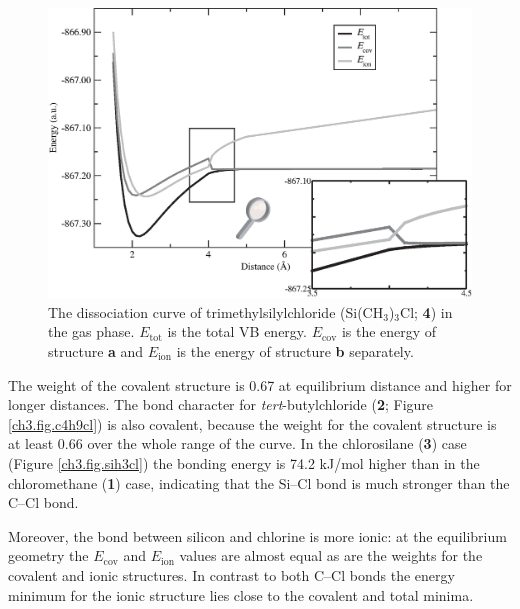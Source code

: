 \begin{figure}[hbtp]
\begin{center}
\includegraphics[scale=0.70]{dissociation/figures/c3h9sicl_g.eps}
\end{center}
\caption{The dissociation curve of trimethylsilylchloride (Si(CH$_3$)$_3$Cl; \textbf{4}) in the gas phase. $E_\mathrm{tot}$ is the total VB energy. $E_\mathrm{cov}$ is the energy of structure \textbf{a} and $E_\mathrm{ion}$ is the energy of structure \textbf{b} separately. }
\label{ch3.fig.c3h9sicl}
\end{figure}
The weight of the covalent structure is 0.67 at equilibrium distance and higher for longer distances. The bond character for \textit{tert}-butylchloride (\textbf{2}; Figure \ref{ch3.fig.c4h9cl}) is also covalent, because the weight for the covalent structure is at least 0.66 over the whole range of the curve.
In the chlorosilane (\textbf{3}) case (Figure \ref{ch3.fig.sih3cl}) the bonding energy is 74.2 kJ/mol higher than in the chloromethane (\textbf{1}) case, indicating that the Si--Cl bond is much stronger than the C--Cl bond. 

Moreover, the bond between silicon and chlorine is more ionic: at the equilibrium geometry the $E_\mathrm{cov}$ and $E_\mathrm{ion}$ values are almost equal as are the weights for the covalent and ionic structures. In contrast to both C--Cl bonds the energy minimum for the ionic structure lies close to the covalent and total minima.  

